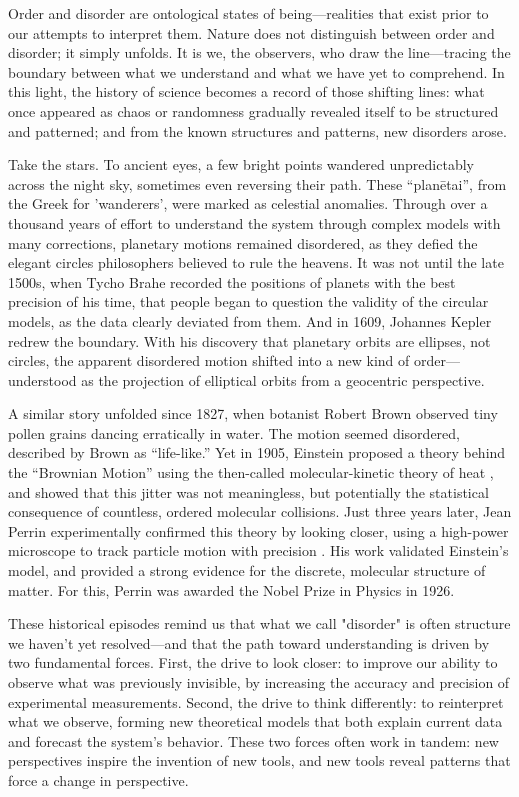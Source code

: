 Order and disorder are ontological states of being—realities that exist prior to our attempts to interpret them. Nature does not distinguish between order and disorder; it simply unfolds. It is we, the observers, who draw the line—tracing the boundary between what we understand and what we have yet to comprehend. In this light, the history of science becomes a record of those shifting lines: what once appeared as chaos or randomness gradually revealed itself to be structured and patterned; and from the known structures and patterns, new disorders arose.

Take the stars. To ancient eyes, a few bright points wandered unpredictably across the night sky, sometimes even reversing their path. These “planētai”, from the Greek for 'wanderers', were marked as celestial anomalies. Through over a thousand years of effort to understand the system through complex models with many corrections, planetary motions remained disordered, as they defied the elegant circles philosophers believed to rule the heavens. It was not until the late 1500s, when Tycho Brahe recorded the positions of planets with the best precision of his time, that people began to question the validity of the circular models, as the data clearly deviated from them. And in 1609, Johannes Kepler redrew the boundary. With his discovery that planetary orbits are ellipses, not circles, the apparent disordered motion shifted into a new kind of order—understood as the projection of elliptical orbits from a geocentric perspective.

A similar story unfolded since 1827, when botanist Robert Brown observed tiny pollen grains dancing erratically in water. The motion seemed disordered, described by Brown as “life-like.” Yet in 1905, Einstein proposed a theory behind the “Brownian Motion” using the then-called molecular-kinetic theory of heat \cite{UberMolekularkinetischenTheorie}, and showed that this jitter was not meaningless, but potentially the statistical consequence of countless, ordered molecular collisions. Just three years later, Jean Perrin experimentally confirmed this theory by looking closer, using a high-power microscope to track particle motion with precision \cite{r.BrownianMovementMolecular1911}. His work validated Einstein’s model, and provided a strong evidence for the discrete, molecular structure of matter. For this, Perrin was awarded the Nobel Prize in Physics in 1926.

These historical episodes remind us that what we call "disorder" is often structure we haven't yet resolved—and that the path toward understanding is driven by two fundamental forces. First, the drive to look closer: to improve our ability to observe what was previously invisible, by increasing the accuracy and precision of experimental measurements. Second, the drive to think differently: to reinterpret what we observe, forming new theoretical models that both explain current data and forecast the system’s behavior. These two forces often work in tandem: new perspectives inspire the invention of new tools, and new tools reveal patterns that force a change in perspective.

